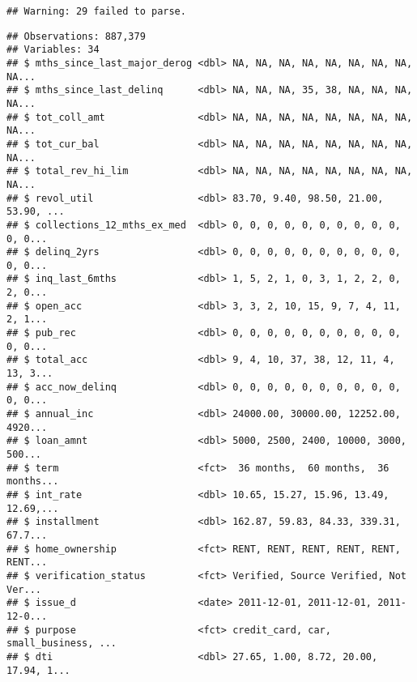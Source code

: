 \documentclass[]{article}
\newenvironment{Shaded}{\begin{snugshade}}{\end{snugshade}}
\newcommand{\KeywordTok}[1]{\textcolor[rgb]{0.13,0.29,0.53}{\textbf{#1}}}
\newcommand{\DecValTok}[1]{\textcolor[rgb]{0.00,0.00,0.81}{#1}}
\newcommand{\OperatorTok}[1]{\textcolor[rgb]{0.81,0.36,0.00}{\textbf{#1}}}
\newcommand{\NormalTok}[1]{#1}
\begin{document}
\begin{verbatim}
## Warning: 29 failed to parse.
\end{verbatim}

\begin{Shaded}
\end{Shaded}

\begin{verbatim}
## Observations: 887,379
## Variables: 34
## $ mths_since_last_major_derog <dbl> NA, NA, NA, NA, NA, NA, NA, NA, NA...
## $ mths_since_last_delinq      <dbl> NA, NA, NA, 35, 38, NA, NA, NA, NA...
## $ tot_coll_amt                <dbl> NA, NA, NA, NA, NA, NA, NA, NA, NA...
## $ tot_cur_bal                 <dbl> NA, NA, NA, NA, NA, NA, NA, NA, NA...
## $ total_rev_hi_lim            <dbl> NA, NA, NA, NA, NA, NA, NA, NA, NA...
## $ revol_util                  <dbl> 83.70, 9.40, 98.50, 21.00, 53.90, ...
## $ collections_12_mths_ex_med  <dbl> 0, 0, 0, 0, 0, 0, 0, 0, 0, 0, 0, 0...
## $ delinq_2yrs                 <dbl> 0, 0, 0, 0, 0, 0, 0, 0, 0, 0, 0, 0...
## $ inq_last_6mths              <dbl> 1, 5, 2, 1, 0, 3, 1, 2, 2, 0, 2, 0...
## $ open_acc                    <dbl> 3, 3, 2, 10, 15, 9, 7, 4, 11, 2, 1...
## $ pub_rec                     <dbl> 0, 0, 0, 0, 0, 0, 0, 0, 0, 0, 0, 0...
## $ total_acc                   <dbl> 9, 4, 10, 37, 38, 12, 11, 4, 13, 3...
## $ acc_now_delinq              <dbl> 0, 0, 0, 0, 0, 0, 0, 0, 0, 0, 0, 0...
## $ annual_inc                  <dbl> 24000.00, 30000.00, 12252.00, 4920...
## $ loan_amnt                   <dbl> 5000, 2500, 2400, 10000, 3000, 500...
## $ term                        <fct>  36 months,  60 months,  36 months...
## $ int_rate                    <dbl> 10.65, 15.27, 15.96, 13.49, 12.69,...
## $ installment                 <dbl> 162.87, 59.83, 84.33, 339.31, 67.7...
## $ home_ownership              <fct> RENT, RENT, RENT, RENT, RENT, RENT...
## $ verification_status         <fct> Verified, Source Verified, Not Ver...
## $ issue_d                     <date> 2011-12-01, 2011-12-01, 2011-12-0...
## $ purpose                     <fct> credit_card, car, small_business, ...
## $ dti                         <dbl> 27.65, 1.00, 8.72, 20.00, 17.94, 1...

\end{verbatim}
\end{document}
